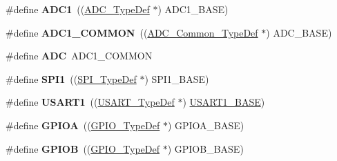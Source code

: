 \begin{DoxyCompactItemize}
\item 
\hypertarget{group___peripheral__declaration_ga90d2d5c526ce5c0a551f533eccbee71a}{\#define {\bfseries A\-D\-C1}~((\hyperlink{struct_a_d_c___type_def}{A\-D\-C\-\_\-\-Type\-Def} $\ast$) A\-D\-C1\-\_\-\-B\-A\-S\-E)}\label{group___peripheral__declaration_ga90d2d5c526ce5c0a551f533eccbee71a}

\item 
\hypertarget{group___peripheral__declaration_gaf1919c64fc774aab31190346fd5457e2}{\#define {\bfseries A\-D\-C1\-\_\-\-C\-O\-M\-M\-O\-N}~((\hyperlink{struct_a_d_c___common___type_def}{A\-D\-C\-\_\-\-Common\-\_\-\-Type\-Def} $\ast$) A\-D\-C\-\_\-\-B\-A\-S\-E)}\label{group___peripheral__declaration_gaf1919c64fc774aab31190346fd5457e2}

\item 
\hypertarget{group___peripheral__declaration_ga54d148b91f3d356713f7e367a2243bea}{\#define {\bfseries A\-D\-C}~A\-D\-C1\-\_\-\-C\-O\-M\-M\-O\-N}\label{group___peripheral__declaration_ga54d148b91f3d356713f7e367a2243bea}

\item 
\hypertarget{group___peripheral__declaration_gad483be344a28ac800be8f03654a9612f}{\#define {\bfseries S\-P\-I1}~((\hyperlink{struct_s_p_i___type_def}{S\-P\-I\-\_\-\-Type\-Def} $\ast$) S\-P\-I1\-\_\-\-B\-A\-S\-E)}\label{group___peripheral__declaration_gad483be344a28ac800be8f03654a9612f}

\item 
\hypertarget{group___peripheral__declaration_ga92871691058ff7ccffd7635930cb08da}{\#define {\bfseries U\-S\-A\-R\-T1}~((\hyperlink{struct_u_s_a_r_t___type_def}{U\-S\-A\-R\-T\-\_\-\-Type\-Def} $\ast$) \hyperlink{group___peripheral__memory__map_ga86162ab3f740db9026c1320d46938b4d}{U\-S\-A\-R\-T1\-\_\-\-B\-A\-S\-E})}\label{group___peripheral__declaration_ga92871691058ff7ccffd7635930cb08da}

\item 
\hypertarget{group___peripheral__declaration_gac485358099728ddae050db37924dd6b7}{\#define {\bfseries G\-P\-I\-O\-A}~((\hyperlink{struct_g_p_i_o___type_def}{G\-P\-I\-O\-\_\-\-Type\-Def} $\ast$) G\-P\-I\-O\-A\-\_\-\-B\-A\-S\-E)}\label{group___peripheral__declaration_gac485358099728ddae050db37924dd6b7}

\item 
\hypertarget{group___peripheral__declaration_ga68b66ac73be4c836db878a42e1fea3cd}{\#define {\bfseries G\-P\-I\-O\-B}~((\hyperlink{struct_g_p_i_o___type_def}{G\-P\-I\-O\-\_\-\-Type\-Def} $\ast$) G\-P\-I\-O\-B\-\_\-\-B\-A\-S\-E)}\label{group___peripheral__declaration_ga68b66ac73be4c836db878a42e1fea3cd}


\end{DoxyCompactItemize}
